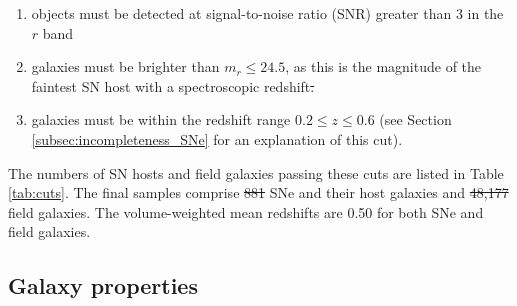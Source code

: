 \documentclass[fleqn,usenatbib]{mnras}
\providecommand{\DIFadd}[1]{{\protect\color{blue}\uwave{#1}}} %
\providecommand{\DIFdel}[1]{{\protect\color{red}\sout{#1}}}                      %
\providecommand{\DIFaddbegin}{} %
\providecommand{\DIFaddend}{} %
\providecommand{\DIFdelbegin}{} %
\providecommand{\DIFdelend}{} %
\newcommand{\DIFscaledelfig}{0.5}
\newlength{\DIFdelgraphicswidth} %
\newlength{\DIFdelgraphicsheight} %
\newcommand{\DIFaddincludegraphics}[2][]{{\color{blue}\fbox{\DIFOincludegraphics[#1]{#2}}}} %
\newcommand{\DIFdelincludegraphics}[2][]{%
\sbox{\DIFdelgraphicsbox}{\DIFOincludegraphics[#1]{#2}}%
\settoboxwidth{\DIFdelgraphicswidth}{\DIFdelgraphicsbox} %
\settoboxtotalheight{\DIFdelgraphicsheight}{\DIFdelgraphicsbox} %
\scalebox{\DIFscaledelfig}{%
\parbox[b]{\DIFdelgraphicswidth}{\usebox{\DIFdelgraphicsbox}\\[-\baselineskip] \rule{\DIFdelgraphicswidth}{0em}}\llap{\resizebox{\DIFdelgraphicswidth}{\DIFdelgraphicsheight}{%
\setlength{\unitlength}{\DIFdelgraphicswidth}%
\begin{picture}(1,1)%
\thicklines\linethickness{2pt} %
{\color[rgb]{1,0,0}\put(0,0){\framebox(1,1){}}}%
{\color[rgb]{1,0,0}\put(0,0){\line( 1,1){1}}}%
{\color[rgb]{1,0,0}\put(0,1){\line(1,-1){1}}}%
\end{picture}%
}\hspace*{3pt}}} %
} %
\DeclareRobustCommand{\DIFaddbegin}{\DIFOaddbegin \let\includegraphics\DIFaddincludegraphics} %
\DeclareRobustCommand{\DIFaddend}{\DIFOaddend \let\includegraphics\DIFOincludegraphics} %
\DeclareRobustCommand{\DIFdelbegin}{\DIFOdelbegin \let\includegraphics\DIFdelincludegraphics} %
\DeclareRobustCommand{\DIFdelend}{\DIFOaddend \let\includegraphics\DIFOincludegraphics} %
\begin{document}
\begin{enumerate}
    \item objects must be detected at signal-to-noise ratio (SNR) greater than 3 in the $r$ band\DIFaddbegin \DIFadd{;
    }\DIFaddend 

    \item galaxies must be brighter than $m_r \leq 24.5$, as this is the magnitude of the faintest SN host with a spectroscopic redshift\DIFdelbegin \DIFdel{.
    }\DIFdelend \DIFaddbegin \DIFadd{;
    }\DIFaddend 

    \item galaxies must be within the redshift range $0.2 \leq z \leq 0.6$ (see Section \ref{subsec:incompleteness_SNe} for an explanation of this cut).
\end{enumerate}

The numbers of SN hosts and field galaxies passing these cuts are listed in Table \ref{tab:cuts}. The final samples comprise \DIFdelbegin \DIFdel{881 }\DIFdelend \DIFaddbegin \DIFadd{809 }\DIFaddend SNe and their host galaxies and \DIFdelbegin \DIFdel{48,177 }\DIFdelend \DIFaddbegin \DIFadd{40,415 }\DIFaddend field galaxies. The volume-weighted mean redshifts are 0.50 for both SNe and field galaxies.

\subsection{Galaxy properties \label{subsec:properties}}
\end{document}
